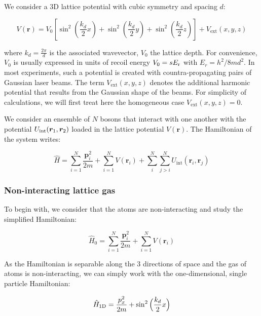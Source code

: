 \label{sec:BH_model}

We consider a 3D lattice potential with cubic symmetry and spacing $d$:

\begin{equation}
    V(\bm{r})=V_{0}\left[\sin ^{2}\left(\frac{k_{d}}{2} x\right)+\sin ^{2}\left(\frac{k_{d}}{2} y\right)+\sin ^{2}\left(\frac{k_{d}}{2} z\right)\right] + V_{\mathrm{ext}} (x,y,z)
\end{equation}

\noindent where $k_d=\frac{2 \pi}{d}$ is the associated wavevector, $V_0$ the lattice depth. For convenience, $V_0$ is usually expressed in units of recoil energy $V_0 = s E_{\rm{r}}$ with $E_r=h^2/ 8 m d^2$. In most experiments, such a potential is created with countra-propagating pairs of Gaussian laser beams. The term $V_{\mathrm{ext}} (x,y,z)$ denotes the additional harmonic potential that results from the Gaussian shape of the beams. For simplicity of calculations, we will first treat here the homogeneous case $V_{\mathrm{ext}} (x,y,z)=0$.

We consider an ensemble of $N$ bosons that interact with one another with the potential $U_{\rm{int}} ( \bm{r}_1, \bm{r}_2)$ loaded in the lattice potential $V(\bm{r})$. The Hamiltonian of the system writes:

\begin{equation}
    \hat{H}=\sum_{i=1}^{N} \frac{\bm{p}_{i}^{2}}{2 m}+\sum_{i=1}^{N} V\left(\bm{r}_{i}\right) + \sum_{i}^{N} \sum_{j>i}^{N} U_{\text{int}}\left(\bm{r}_{i}, \bm{r}_{j}\right)
    \label{eq:H_lattice_full}
\end{equation}

\subsubsection{Non-interacting lattice gas}

To begin with, we consider that the atoms are non-interacting and study the simplified Hamiltonian:

\begin{equation}
    \hat{H}_0=\sum_{i=1}^{N} \frac{\bm{p}_{i}^{2}}{2 m}+\sum_{i=1}^{N} V\left(\bm{r}_{i}\right)
\end{equation}

\noindent As the Hamiltonian is separable along the 3 directions of space and the gas of atoms is non-interacting, we can simply work with the one-dimensional, single particle Hamiltonian:

\begin{equation}
    \hat{H}_{\rm{1D}} = \frac{p_x^2}{2m} + \sin^2 \Big(\frac{k_d}{2} x \Big)
\end{equation}

